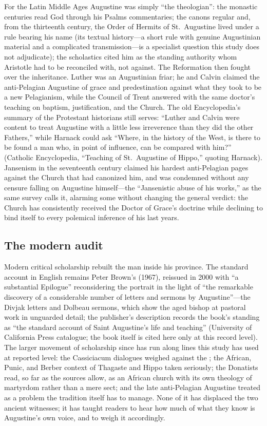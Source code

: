 For the Latin Middle Ages Augustine was simply ``the theologian'': the
monastic centuries read God through his Psalms commentaries; the canons
regular and, from the thirteenth century, the Order of Hermits of
St.~Augustine lived under a rule bearing his name (its textual history---a
short rule with genuine Augustinian material and a complicated
transmission---is a specialist question this study does not adjudicate);
the scholastics cited him as the standing authority whom Aristotle had to
be reconciled with, not against. The Reformation then fought over the
inheritance. Luther was an Augustinian friar; he and Calvin claimed the
anti-Pelagian Augustine of grace and predestination against what they took
to be a new Pelagianism, while the Council of Trent answered with the same
doctor's teaching on baptism, justification, and the Church. The old
Encyclopedia's summary of the Protestant historians still serves:
``Luther and Calvin were content to treat Augustine with a little less
irreverence than they did the other Fathers,'' while Harnack could ask
``Where, in the history of the West, is there to be found a man who, in
point of influence, can be compared with him?'' (Catholic Encyclopedia,
``Teaching of St.~Augustine of Hippo,'' quoting Harnack). Jansenism in the
seventeenth century claimed his hardest anti-Pelagian pages against the
Church that had canonized him, and was condemned without any censure
falling on Augustine himself---the ``Jansenistic abuse of his works,'' as
the same survey calls it, alarming some without changing the general
verdict: the Church has consistently received the Doctor of Grace's
doctrine while declining to bind itself to every polemical inference of his
last years.

\subsection{The modern audit}

Modern critical scholarship rebuilt the man inside his province. The
standard account in English remains Peter Brown's  (1967), reissued in 2000 with ``a substantial Epilogue''
reconsidering the portrait in the light of ``the remarkable discovery of a
considerable number of letters and sermons by Augustine''---the Divjak
letters and Dolbeau sermons, which show the aged bishop at pastoral work in
unguarded detail; the publisher's description records the book's standing
as ``the standard account of Saint Augustine's life and teaching''
(University of California Press catalogue; the book itself is cited here
only at this record level). The larger movement of scholarship since has
run along lines this study has used at reported level: the Cassiciacum
dialogues weighed against the ; the African, Punic, and
Berber context of Thagaste and Hippo taken seriously; the Donatists read,
so far as the sources allow, as an African church with its own theology of
martyrdom rather than a mere sect; and the late anti-Pelagian Augustine
treated as a problem the tradition itself has to manage. None of it has
displaced the two ancient witnesses; it has taught readers to hear how much
of what they know is Augustine's own voice, and to weigh it accordingly.

